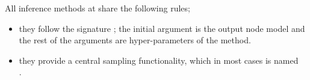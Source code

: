 
All inference methods at  share the following rules;

\begin{itemize}
\item they follow the signature ; the initial argument is the output node model and the rest
  of the arguments are hyper-parameters of the method.
\item they provide a central sampling functionality, which in most
  cases is named \\ .
\end{itemize}
